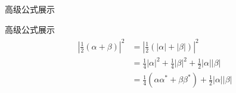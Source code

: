 \documentclass{beamer}  %
\begin{document}
\begin{frame}{高级公式展示}
    \begin{exampleblock}{高级公式展示}
        \begin{align}
            \label{eq:1}
            \begin{split}
                \left| \frac{1}{2}\left( \alpha + \beta \right) \right|^2
                &= \left| \frac{1}{2}\left( \left| \alpha \right| + \left| \beta \right| \right) \right|^2 \\
                &= \frac{1}{4} \left| \alpha \right|^2 + \frac{1}{4} \left| \beta \right|^2 + \frac{1}{2} \left| \alpha \right| \left| \beta \right| \\
                &= \frac{1}{4} \left( \alpha \alpha^* + \beta \beta^* \right) + \frac{1}{2} \left| \alpha \right| \left| \beta \right|
            \end{split}
        \end{align}
    \end{exampleblock}
\end{frame}
\end{document}
